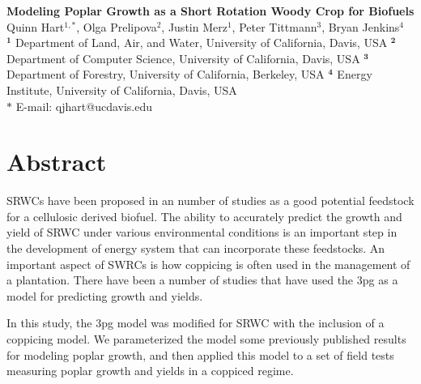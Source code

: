 \documentclass[10pt]{article}
\date{}
\begin{document}
\begin{flushleft}
{\Large
\textbf{Modeling Poplar Growth as a Short Rotation Woody Crop for Biofuels}
}
\\
Quinn Hart$^{1,\ast}$,
Olga Prelipova$^{2}$,
Justin Merz$^{1}$,
Peter Tittmann$^{3}$, 
Bryan Jenkins$^{4}$
\\
$^{\textbf{1}}$ Department of Land, Air, and Water, University of California, Davis, USA
$^{\textbf{2}}$ Department of Computer Science, University of California, Davis, USA
$^{\textbf{3}}$ Department of Forestry, University of California, Berkeley, USA
$^{\textbf{4}}$ Energy Institute, University of California, Davis, USA
\\
$\ast$ E-mail: qjhart@ucdavis.edu
\end{flushleft}

\section*{Abstract}

\acp{SRWC} have been proposed in an number of studies as a good
potential feedstock for a cellulosic derived biofuel.  The ability to
accurately predict the growth and yield of \ac{SRWC} under various
environmental conditions is an important step in the development of
energy system that can incorporate these feedstocks.  An important
aspect of \acp{SWRC} is how coppicing is often used in the management
of a plantation.  There have been a number of studies that have used
the \ac{3pg} as a model for predicting growth and yields. 

In this study, the \acf{3pg} model was modified for \ac{SRWC} with the
inclusion of a coppicing model.  We parameterized the model some
previously published results for modeling poplar growth, and then
applied this model to a set of field tests measuring poplar growth and
yields in a coppiced regime.
 
\end{document}
